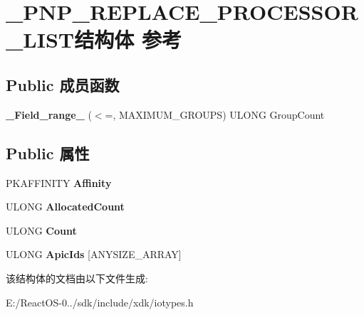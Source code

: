 \hypertarget{struct___p_n_p___r_e_p_l_a_c_e___p_r_o_c_e_s_s_o_r___l_i_s_t}{}\section{\+\_\+\+P\+N\+P\+\_\+\+R\+E\+P\+L\+A\+C\+E\+\_\+\+P\+R\+O\+C\+E\+S\+S\+O\+R\+\_\+\+L\+I\+S\+T结构体 参考}
\label{struct___p_n_p___r_e_p_l_a_c_e___p_r_o_c_e_s_s_o_r___l_i_s_t}
\subsection*{Public 成员函数}
\begin{DoxyCompactItemize}
\item 
\mbox{\label{struct___p_n_p___r_e_p_l_a_c_e___p_r_o_c_e_s_s_o_r___l_i_s_t_a5bc6b3f4b13f4b74bcb90895e07df9ff}} 
{\bfseries \+\_\+\+Field\+\_\+range\+\_\+} ($<$=, M\+A\+X\+I\+M\+U\+M\+\_\+\+G\+R\+O\+U\+PS) U\+L\+O\+NG Group\+Count
\end{DoxyCompactItemize}
\subsection*{Public 属性}
\begin{DoxyCompactItemize}
\item 
\mbox{\label{struct___p_n_p___r_e_p_l_a_c_e___p_r_o_c_e_s_s_o_r___l_i_s_t_a798f2b0a10509a128996a359eedc6ed3}} 
P\+K\+A\+F\+F\+I\+N\+I\+TY {\bfseries Affinity}
\item 
\mbox{\label{struct___p_n_p___r_e_p_l_a_c_e___p_r_o_c_e_s_s_o_r___l_i_s_t_a33e6b1b7171caf3c9d5a8ab0b19ebb3e}} 
U\+L\+O\+NG {\bfseries Allocated\+Count}
\item 
\mbox{\label{struct___p_n_p___r_e_p_l_a_c_e___p_r_o_c_e_s_s_o_r___l_i_s_t_a1232aea8990be6870533318ab81bfe4a}} 
U\+L\+O\+NG {\bfseries Count}
\item 
\mbox{\label{struct___p_n_p___r_e_p_l_a_c_e___p_r_o_c_e_s_s_o_r___l_i_s_t_af49501798513acd4c613281b2b78266e}} 
U\+L\+O\+NG {\bfseries Apic\+Ids} \mbox{[}A\+N\+Y\+S\+I\+Z\+E\+\_\+\+A\+R\+R\+AY\mbox{]}
\end{DoxyCompactItemize}


该结构体的文档由以下文件生成\+:\begin{DoxyCompactItemize}
\item 
E\+:/\+React\+O\+S-\/0../sdk/include/xdk/iotypes.\+h\end{DoxyCompactItemize}
